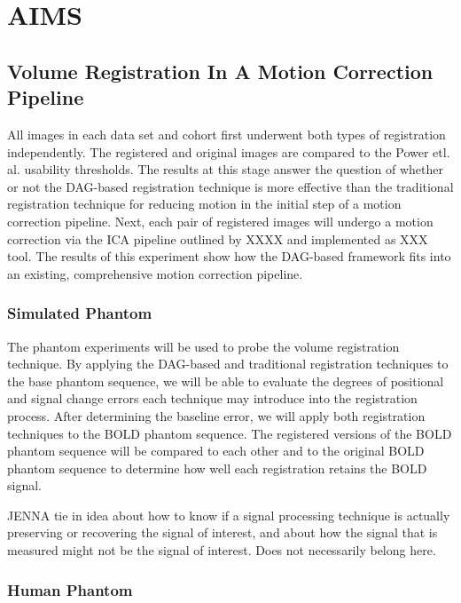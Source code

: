 \chapter{AIMS}
\label{ch:experiments}

\section{Volume Registration In A Motion Correction Pipeline}

All images in each data set and cohort first underwent both types of registration independently. The registered and original images are compared to the Power etl. al. usability thresholds. The results at this stage answer the question of whether or not the DAG-based registration technique is more effective than the traditional registration technique for reducing motion in the initial step of a motion correction pipeline.  Next, each pair of registered images will undergo a motion correction via the ICA pipeline outlined by XXXX and implemented as XXX tool. The results of this experiment show how the DAG-based framework fits into an existing, comprehensive motion correction pipeline. 

\subsection{Simulated Phantom}

The phantom experiments will be used to probe the volume registration technique. By applying the DAG-based and traditional registration techniques to the base phantom sequence, we will be able to evaluate the degrees of positional and signal change errors each technique may introduce into the registration process. After determining the baseline error, we will apply both registration techniques to the BOLD phantom sequence. The registered versions of the BOLD phantom sequence will be compared to each other and to the original BOLD phantom sequence to determine how well each registration retains the BOLD signal.

JENNA tie in idea about how to know if a signal processing technique is actually preserving or recovering the signal of interest, and about how the signal that is measured might not be the signal of interest. Does not necessarily belong here.

\subsection{Human Phantom}

